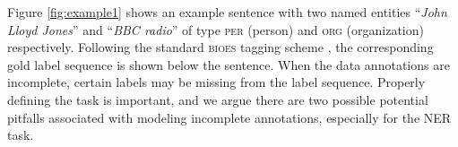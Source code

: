 Figure \ref{fig:example1} shows an example sentence with two named entities ``{\em John Lloyd Jones}'' and ``{\em BBC radio}'' of type \textsc{per} (person) and \textsc{org} (organization) respectively. 
Following the standard \textsc{bioes} tagging scheme \cite{ramshaw1999text,ratinov2009design}, the corresponding gold label sequence is shown below the sentence.
When the data annotations are incomplete, certain labels may be missing from the label sequence.
Properly defining the task is important, and we argue there are two possible potential pitfalls associated with modeling incomplete annotations, especially for the NER task.

